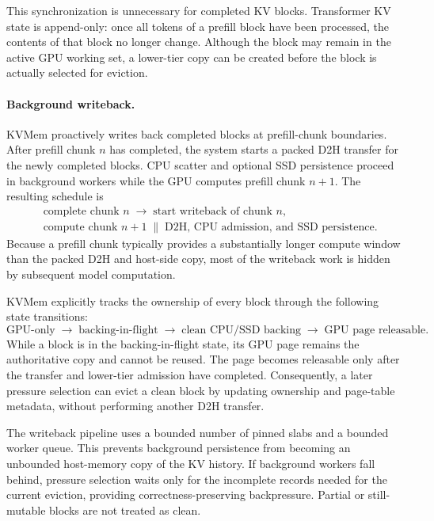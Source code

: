 This synchronization is unnecessary for completed KV blocks.  Transformer KV
state is append-only: once all tokens of a prefill block have been processed,
the contents of that block no longer change.  Although the block may remain in
the active GPU working set, a lower-tier copy can be created before the block
is actually selected for eviction.

\paragraph{Background writeback.}
KVMem proactively writes back completed blocks at prefill-chunk boundaries.
After prefill chunk \(n\) has completed, the system starts a packed D2H
transfer for the newly completed blocks.  CPU scatter and optional SSD
persistence proceed in background workers while the GPU computes prefill
chunk \(n+1\).  The resulting schedule is
\begin{equation}
\begin{split}
  &\text{complete chunk } n
  \;\rightarrow\; \text{start writeback of chunk } n,\\
  &\text{compute chunk } n+1
  \;\parallel\; \text{D2H, CPU admission, and SSD persistence}.
\end{split}
\label{eq:proactive-writeback-schedule}
\end{equation}
Because a prefill chunk typically provides a substantially longer compute
window than the packed D2H and host-side copy, most of the writeback work is
hidden by subsequent model computation.

KVMem explicitly tracks the ownership of every block through the following
state transitions:
\begin{equation}
  \text{GPU-only}
  \;\rightarrow\;
  \text{backing-in-flight}
  \;\rightarrow\;
  \text{clean CPU/SSD backing}
  \;\rightarrow\;
  \text{GPU page releasable}.
  \label{eq:writeback-ownership}
\end{equation}
While a block is in the backing-in-flight state, its GPU page remains the
authoritative copy and cannot be reused.  The page becomes releasable only
after the transfer and lower-tier admission have completed.  Consequently, a
later pressure selection can evict a clean block by updating ownership and
page-table metadata, without performing another D2H transfer.

The writeback pipeline uses a bounded number of pinned slabs and a bounded
worker queue.  This prevents background persistence from becoming an
unbounded host-memory copy of the KV history.  If background workers fall
behind, pressure selection waits only for the incomplete records needed for
the current eviction, providing correctness-preserving backpressure.  Partial
or still-mutable blocks are not treated as clean.

